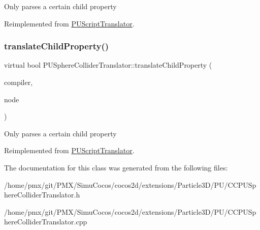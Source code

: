 Only parses a certain child property 

Reimplemented from \hyperlink{classPUScriptTranslator_a0374d83a8a04e57918975d525e0f8fe8}{P\+U\+Script\+Translator}.

\mbox{\label{classPUSphereColliderTranslator_a31cab609b82fed8cc69ac4893b3e171c}} 
\subsubsection{\texorpdfstring{translate\+Child\+Property()}{translateChildProperty()}\hspace{0.1cm}{\footnotesize\ttfamily [2/2]}}
{\footnotesize\ttfamily virtual bool P\+U\+Sphere\+Collider\+Translator\+::translate\+Child\+Property (\begin{DoxyParamCaption}\item[{\hyperlink{classPUScriptCompiler}{P\+U\+Script\+Compiler} $\ast$}]{compiler,  }\item[{\hyperlink{classPUAbstractNode}{P\+U\+Abstract\+Node} $\ast$}]{node }\end{DoxyParamCaption})\hspace{0.3cm}{\ttfamily [virtual]}}

Only parses a certain child property 

Reimplemented from \hyperlink{classPUScriptTranslator_a0374d83a8a04e57918975d525e0f8fe8}{P\+U\+Script\+Translator}.



The documentation for this class was generated from the following files\+:\begin{DoxyCompactItemize}
\item 
/home/pmx/git/\+P\+M\+X/\+Simu\+Cocos/cocos2d/extensions/\+Particle3\+D/\+P\+U/C\+C\+P\+U\+Sphere\+Collider\+Translator.\+h\item 
/home/pmx/git/\+P\+M\+X/\+Simu\+Cocos/cocos2d/extensions/\+Particle3\+D/\+P\+U/C\+C\+P\+U\+Sphere\+Collider\+Translator.\+cpp\end{DoxyCompactItemize}
